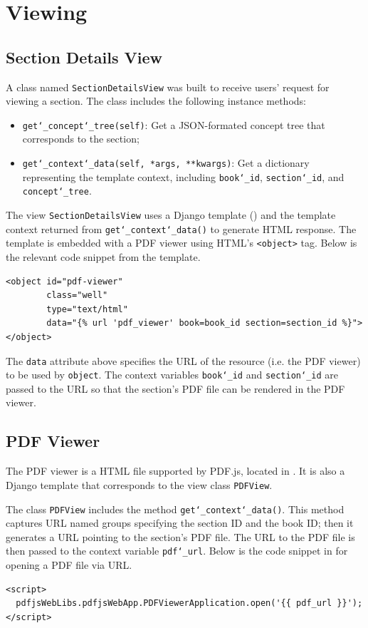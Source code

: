 \section{Viewing}
\subsection{Section Details View}
A class named \texttt{SectionDetailsView} was built to receive users' request for viewing a section. The class includes the following instance methods:
\begin{itemize}
\item \texttt{get\char`_concept\char`_tree(self)}: Get a JSON-formated concept tree that corresponds to the section;
\item \texttt{get\char`_context\char`_data(self, *args, **kwargs)}: Get a dictionary representing the template context, including \texttt{book\char`_id}, \texttt{section\char`_id}, and \texttt{concept\char`_tree}.
\end{itemize}

The view \texttt{SectionDetailsView} uses a Django template () and the template context returned from \texttt{get\char`_context\char`_data()} to generate HTML response. The template is embedded with a PDF viewer using HTML's \texttt{<object>} tag. Below is the relevant code snippet from the template.

\begin{verbatim}
<object id="pdf-viewer" 
        class="well" 
        type="text/html" 
        data="{% url 'pdf_viewer' book=book_id section=section_id %}">
</object>
\end{verbatim}

The \texttt{data} attribute above specifies the URL of the resource (i.e. the PDF viewer) to be used by \texttt{object}. The context variables \texttt{book\char`_id} and \texttt{section\char`_id} are passed to the URL so that the section's PDF file can be rendered in the PDF viewer.

\subsection{PDF Viewer}
The PDF viewer is a HTML file supported by PDF.js, located in . It is also a Django template that corresponds to the view class \texttt{PDFView}.

The class \texttt{PDFView} includes the method \texttt{get\char`_context\char`_data()}. This method captures URL named groups specifying the section ID and the book ID; then it generates a URL pointing to the section's PDF file. The URL to the PDF file is then passed to the context variable \texttt{pdf\char`_url}. Below is the code snippet in  for opening a PDF file via URL.
\begin{verbatim}
<script>
  pdfjsWebLibs.pdfjsWebApp.PDFViewerApplication.open('{{ pdf_url }}');
</script>
\end{verbatim}

